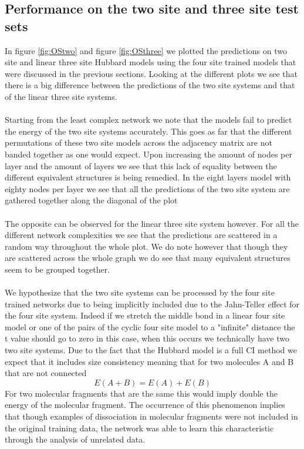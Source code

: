 \documentclass[12pt]{article}
\begin{document}
\subsection{Performance on the two site and three site test sets}
In figure \ref{fig:OStwo} and figure \ref{fig:OSthree} we plotted the predictions on two site and linear three site Hubbard models using the four site trained models that were discussed in the previous sections. Looking at the different plots we see that there is a big difference between the predictions of the two site systems and that of the linear three site systems.
\\
\\
Starting from the least complex network we note that the models fail to predict the energy of the two site systems accurately. This goes as far that the different permutations of these two site models across the adjacency matrix are not banded together as one would expect. Upon increasing the amount of nodes per layer and the amount of layers we see that this lack of equality between the different equivalent structures is being remedied. In the eight layers model with eighty nodes per layer we see that all the predictions of the two site system are gathered together along the diagonal of the plot
\\
\\
The opposite can be observed for the linear three site system however. For all the different network complexities we see that the predictions are scattered in a random way throughout the whole plot. We do note however that though they are scattered across the whole graph we do see that many equivalent structures seem to be grouped together. 
\\
\\
We hypothesize that the two site systems can be processed by the four site trained networks due to being implicitly included due to the Jahn-Teller effect for the four site system. Indeed if we stretch the middle bond in a linear four site model or one of the pairs of the cyclic four site model to a "infinite" distance the t value should go to zero in this case, when this occurs we technically have two two site systems. Due to the fact that the Hubbard model is a full CI method we expect that it includes size consistency meaning that for two molecules A and B that are not connected
\begin{equation*}
E\left(A+B\right)=E\left(A\right)+E\left(B\right)
\end{equation*} 
For two molecular fragments that are the same this would imply double the energy of the molecular fragment. The occurrence of this phenomenon implies that though examples of dissociation in molecular fragments were not included in the original training data, the network was able to learn this characteristic through the analysis of unrelated data.
\end{document}
